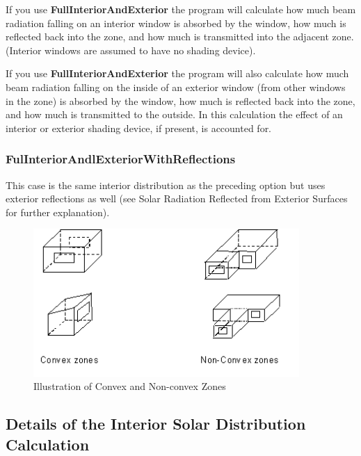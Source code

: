 If you use \textbf{FullInteriorAndExterior} the program will calculate how much beam radiation falling on an interior window is absorbed by the window, how much is reflected back into the zone, and how much is transmitted into the adjacent zone. (Interior windows are assumed to have no shading device).

If you use \textbf{FullInteriorAndExterior} the program will also calculate how much beam radiation falling on the inside of an exterior window (from other windows in the zone) is absorbed by the window, how much is reflected back into the zone, and how much is transmitted to the outside. In this calculation the effect of an interior or exterior shading device, if present, is accounted for.

\subsubsection{FulInteriorAndlExteriorWithReflections}\label{fulinteriorandlexteriorwithreflections}

This case is the same interior distribution as the preceding option but uses exterior reflections as well (see Solar Radiation Reflected from Exterior Surfaces for further explanation).

\begin{figure}[hbtp] %
\centering
\includegraphics[width=0.9\textwidth, height=0.9\textheight, keepaspectratio=true]{media/image646.png}
\caption{Illustration of Convex and Non-convex Zones \protect \label{fig:illustration-of-convex-and-non-convex-zones}}
\end{figure}

\subsection{Details of the Interior Solar Distribution Calculation}\label{details-of-the-interior-solar-distribution-calculation}

